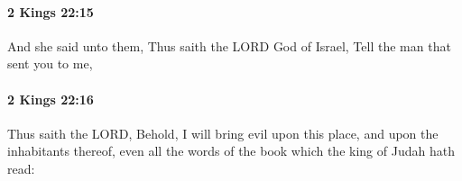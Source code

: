 		\paragraph{2 Kings 22:15} %
			\label{2KINGS-22-15}

			And she said unto them, Thus saith the LORD God of Israel, Tell the man that sent you to me,


		\paragraph{2 Kings 22:16} %
			\label{2KINGS-22-16}

			Thus saith the LORD, Behold, I will bring evil upon this place, and upon the inhabitants thereof, even all the words of the book which the king of Judah hath read:



